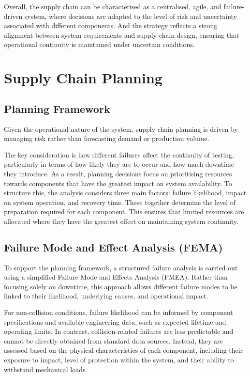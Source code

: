 \documentclass[11pt, a4paper]{report}
\numberwithin{equation}{section}
\begin{document}
Overall, the supply chain can be characterised as a centralised, agile, and failure-driven system, where decisions are adapted to the level of risk and uncertainty associated with different components. And the strategy reflects a strong alignment between system requirements and supply chain design, ensuring that operational continuity is maintained under uncertain conditions.

\section{Supply Chain Planning}

\subsection{Planning Framework}
\label{subsec:supply_chain_planning_framework}

Given the operational nature of the system, supply chain planning is driven by managing risk rather than forecasting demand or production volume.

The key consideration is how different failures affect the continuity of testing, particularly in terms of how likely they are to occur and how much downtime they introduce. As a result, planning decisions focus on prioritising resources towards components that have the greatest impact on system availability.  To structure this, the analysis considers three main factors: failure likelihood, impact on system operation, and recovery time. These together determine the level of preparation required for each component. This ensures that limited resources are allocated where they have the greatest effect on maintaining system continuity.

\subsection{Failure Mode and Effect Analysis (FEMA)}

To support the planning framework, a structured failure analysis is carried out using a simplified Failure Mode and Effects Analysis (FMEA)\cite{FMEA_lecture_notes}. Rather than focusing solely on downtime, this approach allows different failure modes to be linked to their likelihood, underlying causes, and operational impact.

For non-collision conditions, failure likelihood can be informed by component specifications and available engineering data, such as expected lifetime and operating limits. In contrast, collision-related failures are less predictable and cannot be directly obtained from standard data sources. Instead, they are assessed based on the physical characteristics of each component, including their exposure to impact, level of protection within the system, and their ability to withstand mechanical loads.
\end{document}
